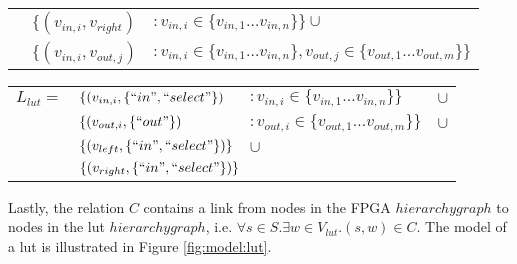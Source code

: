 \begin{defn}
\begin{itemize}
\begin{tabular}{lll}
&$\{(v_{in, i}, v_{right})$&$: v_{in, i} \in \{v_{in, 1} \dots v_{in, n}\}\} \cup$\\

&$\{(v_{in, i}, v_{out, j})$&$: v_{in, i} \in \{v_{in, 1} \dots v_{in, n}\}, v_{out, j} \in \{v_{out, 1} \dots v_{out, m}\}\}$\\

\end{tabular}

\begin{tabular}{llll}
$L_{lut}=$&$\{(v_{in, i}, \{``in", ``select"\})$&$: v_{in, i} \in \{v_{in, 1} \dots v_{in, n}\}\}$&$\cup$\\
&$\{(v_{out, i}, \{``out"\})$&$: v_{out, i} \in \{v_{out, 1} \dots v_{out, m}\}\}$&$\cup$\\
&$\{(v_{left}, \{``in", ``select"\})\}$&$\cup$&\\
&\multicolumn{2}{l}{$\{(v_{right}, \{``in", ``select"\})\}$}&\\
\end{tabular}

Lastly, the relation $C$ contains a link from nodes in the FPGA $hierarchygraph$ to nodes in the lut $hierarchygraph$, i.e. $\forall s \in S . \exists w \in V_{lut} . (s, w) \in C$.
The model of a lut is illustrated in Figure \ref{fig:model:lut}.

 
 \begin{figure}
\centering
\begin{adjustbox}{width=0.7\textwidth}
\end{adjustbox}
\end{figure}
\end{itemize}
\end{defn}
